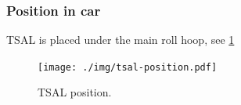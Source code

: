 \subsubsection{Position in car}
TSAL is placed under the main roll hoop, see \ref{fig:TSAL-position}

\begin{figure}[H]
	\centering
	\texttt{[image: ./img/tsal-position.pdf]}
	\caption{TSAL position.}
	\label{fig:TSAL-position}
\end{figure}